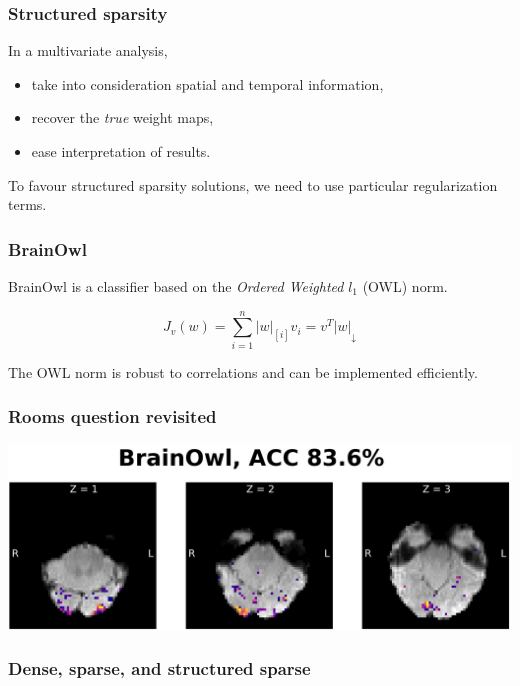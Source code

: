 \documentclass[11pt]{beamer}
\begin{document}
\begin{frame}
    \frametitle{Structured sparsity}
    In a multivariate analysis,
    \begin{itemize}
        \item take into consideration spatial and temporal information, \pause
        \item recover the \emph{true} weight maps, \pause
        \item ease interpretation of results. \pause
    \end{itemize}

    To favour structured sparsity solutions, we need to use particular
    regularization terms.

\end{frame}

\begin{frame}
    \frametitle{BrainOwl}
    BrainOwl is a classifier based on the \emph{Ordered Weighted} $l_1$
    (OWL) norm.

    \[J_v(w) = \sum_{i=1}^{n} |w|_{[i]} v_i = v^T |w|_{\downarrow}\]

    The OWL norm is robust to correlations and can be implemented efficiently.

\end{frame}

\begin{frame}
    \frametitle{Rooms question revisited}

    \begin{center}
        \includegraphics[scale=0.7]{figures/brainowl-axial.png}
    \end{center}

\end{frame}

\begin{frame}
    \frametitle{Dense, sparse, and structured sparse}
\end{frame}
\end{document}
